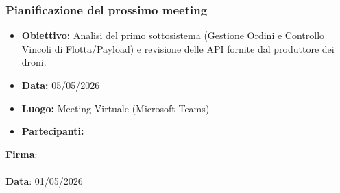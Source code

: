 \documentclass[12pt, a4paper]{article}
\begin{document}
\subsubsection*{Pianificazione del prossimo meeting}
\begin{itemize}
    \item \textbf{Obiettivo:} Analisi del primo sottosistema (Gestione Ordini e Controllo Vincoli di Flotta/Payload) e revisione delle API fornite dal produttore dei droni.
    \item \textbf{Data:} 05/05/2026
    \item \textbf{Luogo:} Meeting Virtuale (Microsoft Teams)
    \item \textbf{Partecipanti:} %
\end{itemize}

\vspace{1.5cm}
\noindent
\textbf{Firma}: \hrulefill \\ \\
\textbf{Data}: 01/05/2026
\end{document}
